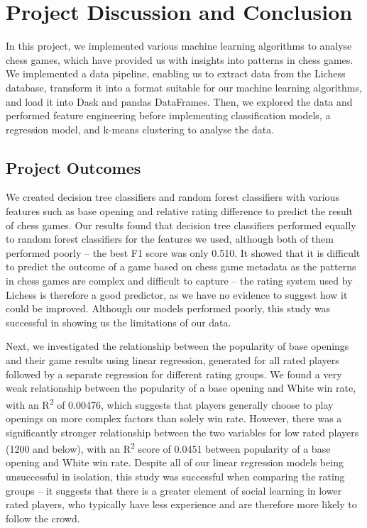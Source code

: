 \documentclass[a4paper, 11pt]{article}
\begin{document}
\section{Project Discussion and Conclusion}
In this project, we implemented various machine learning algorithms to analyse chess games, which have provided us with insights into patterns in chess games. We implemented a data pipeline, enabling us to extract data from the Lichess database, transform it into a format suitable for our machine learning algorithms, and load it into Dask and pandas DataFrames. Then, we explored the data and performed feature engineering before implementing classification models, a regression model, and k-means clustering to analyse the data.

\subsection{Project Outcomes}
We created decision tree classifiers and random forest classifiers with various features such as base opening and relative rating difference to predict the result of chess games. Our results found that decision tree classifiers performed equally to random forest classifiers for the features we used, although both of them performed poorly -- the best F1 score was only 0.510. It showed that it is difficult to predict the outcome of a game based on chess game metadata as the patterns in chess games are complex and difficult to capture -- the rating system used by Lichess is therefore a good predictor, as we have no evidence to suggest how it could be improved. Although our models performed poorly, this study was successful in showing us the limitations of our data.

Next, we investigated the relationship between the popularity of base openings and their game results using linear regression, generated for all rated players followed by a separate regression for different rating groups. We found a very weak relationship between the popularity of a base opening and White win rate, with an R\textsuperscript{2} of 0.00476, which suggests that players generally choose to play openings on more complex factors than solely win rate. However, there was a significantly stronger relationship between the two variables for low rated players (1200 and below), with an R\textsuperscript{2} score of 0.0451 between popularity of a base opening and White win rate. Despite all of our linear regression models being unsuccessful in isolation, this study was successful when comparing the rating groups -- it suggests that there is a greater element of social learning in lower rated players, who typically have less experience and are therefore more likely to follow the crowd.
\end{document}
